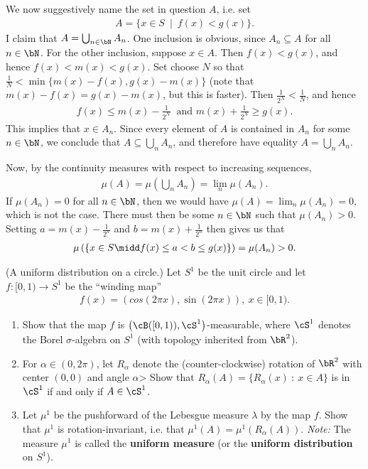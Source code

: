 \begin{homework}[e]
\begin{prf}
		We now suggestively name the set in question $A$, i.e. set
		\begin{align*}
			A = \{x\in S ~\mid~ f(x) < g(x)\}.
		\end{align*}
		I claim that $A = \bigcup_{n \in \bN} A_n$. One inclusion is obvious, since $A_n \subseteq A$ for all $n\in \bN$. For the other inclusion, suppose $x \in A$. Then $f(x) < g(x)$, and hence $f(x) < m(x) < g(x)$. Set choose $N$ so that $\frac{1}{N} < \min\{m(x) - f(x), g(x) - m(x)\}$ (note that $m(x) - f(x) = g(x) - m(x)$, but this is faster). Then $\frac{1}{2^N} < \frac{1}{N}$, and hence
		\begin{align*}
			f(x) \leq m(x) - \frac{1}{2^N} ~\text{ and } m(x) + \frac{1}{2^N} \geq g(x).
		\end{align*}
		This implies that $x \in A_n$. Since every element of $A$ is contained in $A_n$ for some $n \in \bN$, we conclude that $A \subseteq \bigcup_n A_n$, and therefore have equality $A = \bigcup_n A_n$.

		Now, by the continuity measures with respect to increasing sequences,
		\begin{align*}
			\mu\left(A\right) = \mu\left(\bigcup_n A_n\right) = \lim_n \mu(A_n).
		\end{align*}
		If $\mu(A_n) = 0$ for all $n \in \bN$, then we would have $\mu(A) = \lim_n\mu(A_n) = 0 $, which is not the case. There must then be some $n\in \bN$ such that $\mu(A_n) > 0$. Setting $a = m(x) - \frac{1}{2^n}$ and $b = m(x) + \frac{1}{2^n}$ then gives us that
		\begin{align*}
			\mu\left(\left\{x \in S \midd f(x) \leq a < b \leq g(x)\right\} \right) = \mu(A_n) > 0.
		\end{align*}
	\end{prf}
	 (A uniform distribution on a circle.) Let $S^1$ be the unit circle and let $f:[0,1) \to S^1$ be the ``winding map''
	\begin{align*}
		f(x) = \left(cos(2\pi x),\sin(2\pi x)\right), ~ x\in [0,1).
	\end{align*}
	\begin{enumerate}[(1)]
		\item Show that the map $f$ is $\big(\cB([0,1)), \cS^1\big)$-measurable, where $\cS^1$ denotes the Borel $\sigma$-algebra on $S^1$ (with topology inherited from $\bR^2$).
		\item For $\alpha \in (0,2\pi)$, let $R_\alpha$ denote the (counter-clockwise) rotation of $\bR^2$ with center $(0,0)$ and angle $\alpha$> Show that $R_\alpha(A) = \{R_\alpha(x) ~ : ~ x \in A\}$  is in $\cS^1$ if and only if $A \in \cS^1$.
		\item Let $\mu^1$ be the pushforward of the Lebesgue measure $\lambda$ by the map $f$. Show that $\mu^1$ is rotation-invariant, i.e. that $\mu^1(A) = \mu^1(R_\alpha(A))$. \small{\emph{Note:} The measure $\mu^1$ is called the \textbf{uniform measure} (or the \textbf{uniform distribution} on $S^1$)}.
	\end{enumerate}
	\begin{prf}$ $


\end{prf}
\end{homework}
